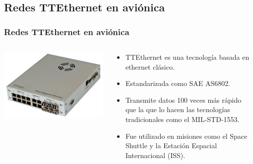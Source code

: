 \subsection{Redes TTEthernet en aviónica}
\begin{frame}
	\frametitle{Redes TTEthernet en aviónica}
	\begin{columns}[T]
		\begin{column}{.5\textwidth}
			\includegraphics[scale=0.4]{images/ttethernet.png}
		\end{column}
		\begin{column}{.5\textwidth}
			\begin{itemize}
				\item TTEthernet es una tecnología basada en ethernet clásico. 
				\item Estandarizada como SAE AS6802.
				\item Transmite datos 100 veces más rápido que la que lo hacen las tecnologías tradicionales como el MIL-STD-1553.
				\item Fue utilizado en misiones como el Space Shuttle y la Estación Espacial Internacional (ISS).
			\end{itemize}
		\end{column}
	\end{columns}
\end{frame}